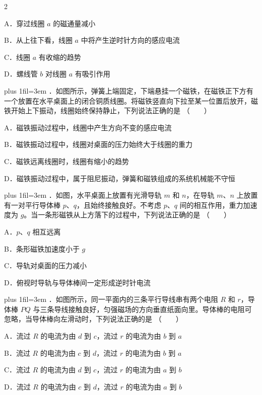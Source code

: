 \documentclass[fontset=none]{ctexart}
\newcommand{\xzitem}[2]{\par\glueguard{1}%
  {\rightskip=0pt plus 1fil\parfillskip=0pt\emergencystretch=3em\noindent
   {\fontsize{11.4pt}{14pt}\selectfont\heihao {\numboldjian #1}．}\hspace{4.1mm}#2%
   \penalty0\hbox{}\nobreak\hspace{0pt plus 1000fil}\nobreak\mbox{（　　）}\hspace{0.56mm}\par}%
  \addvspace{0pt}}
\begin{document}
\begin{multicols}{2}

\bindopt A．穿过线圈 $a$ 的磁通量减小\par
\bindopt B．从上往下看，线圈 $a$ 中将产生逆时针方向的感应电流\par
\bindopt C．线圈 $a$ 有收缩的趋势\par
\bindopt D．螺线管 $b$ 对线圈 $a$ 有吸引作用\par

\xzitem{5}{如图所示，弹簧上端固定，下端悬挂一个磁铁，在磁铁正下方有一个放置在水平桌面上的闭合铜质线圈。将磁铁竖直向下拉至某一位置后放开，磁铁开始上下振动，线圈始终保持静止，下列说法正确的是}


\bindopt A．磁铁振动过程中，线圈中产生方向不变的感应电流\par
\bindopt B．磁铁振动过程中，线圈对桌面的压力始终大于线圈的重力\par
\bindopt C．磁铁远离线圈时，线圈有缩小的趋势\par
\bindopt D．磁铁振动过程中，属于阻尼振动，弹簧和磁铁组成的系统机械能不守恒\par


\xzitem{6}{如图，水平桌面上放置有光滑导轨 $m$ 和 $n$，在导轨 $m$、$n$ 上放置有一对平行导体棒 $p$、$q$，且始终接触良好。不考虑 $p$、$q$ 间的相互作用，重力加速度为 $g$。当一条形磁铁从上方落下的过程中，下列说法正确的是}


\bindopt A．$p$、$q$ 相互远离\par
\bindopt B．条形磁铁加速度小于 $g$\par
\bindopt C．导轨对桌面的压力减小\par
\bindopt D．俯视时导轨与导体棒间一定形成逆时针电流\par


\xzitem{7}{如图所示，同一平面内的三条平行导线串有两个电阻 $R$ 和 $r$，导体棒 $PQ$ 与三条导线接触良好，匀强磁场的方向垂直纸面向里。导体棒的电阻可忽略，当导体棒向左滑动时，下列说法正确的是}


\bindopt A．流过 $R$ 的电流为由 $d$ 到 $c$，流过 $r$ 的电流为由 $b$ 到 $a$\par
\bindopt B．流过 $R$ 的电流为由 $c$ 到 $d$，流过 $r$ 的电流为由 $b$ 到 $a$\par
\bindopt C．流过 $R$ 的电流为由 $d$ 到 $c$，流过 $r$ 的电流为由 $a$ 到 $b$\par
\bindopt D．流过 $R$ 的电流为由 $c$ 到 $d$，流过 $r$ 的电流为由 $a$ 到 $b$\par

\end{multicols}
\end{document}
